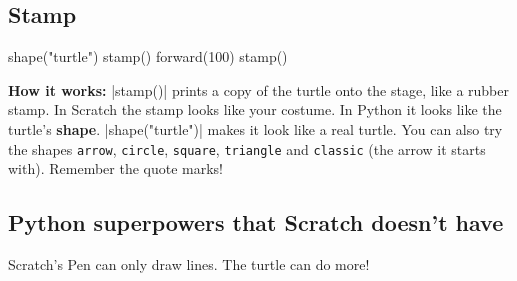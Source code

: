 \subsection*{Stamp}

\begin{tcbraster}[raster columns=2, raster equal height=rows, raster column skip=12pt, raster valign=center]
\begin{tcolorbox}[colback=white, colframe=white, boxrule=0pt, valign=center]
\begin{scratch}
\end{scratch}
\end{tcolorbox}
\begin{code}
shape("turtle")
stamp()
forward(100)
stamp()
\end{code}
\end{tcbraster}

\textbf{How it works:} \py|stamp()| prints a copy of the turtle onto the stage, like a rubber stamp. In Scratch the stamp looks like your costume. In Python it looks like the turtle's \textbf{shape}. \py|shape("turtle")| makes it look like a real turtle. You can also try the shapes \texttt{arrow}, \texttt{circle}, \texttt{square}, \texttt{triangle} and \texttt{classic} (the arrow it starts with). Remember the quote marks!

\subsection*{Python superpowers that Scratch doesn't have}

Scratch's Pen can only draw lines. The turtle can do more!

